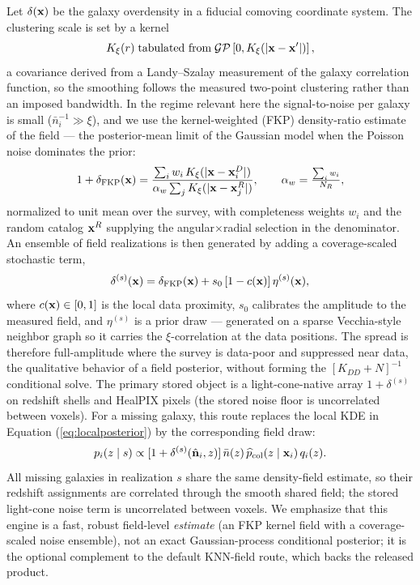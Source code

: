 \documentclass[apj]{emulateapj}
\begin{document}
Let $\delta({\bf x})$ be the galaxy overdensity in a fiducial comoving
coordinate system.  The clustering scale is set by a kernel
\begin{equation}
  K_\xi(r) \;\text{tabulated from}\;
  {\cal GP}\left[0,K_\xi(|{\bf x}-{\bf x}'|)\right],
  \label{eq:gpprior}
\end{equation}
a covariance derived from a Landy--Szalay measurement of the galaxy correlation
function, so the smoothing follows the measured two-point clustering rather than
an imposed bandwidth.  In the regime relevant here the signal-to-noise per
galaxy is small ($\bar n_i^{-1}\!\gg\!\xi$), and we use the kernel-weighted
(FKP) density-ratio estimate of the field --- the posterior-mean limit of the
Gaussian model when the Poisson noise dominates the prior:
\begin{equation}
  1+\delta_{\rm FKP}({\bf x}) =
  \frac{\sum_i w_i\,K_\xi(|{\bf x}-{\bf x}_i^{D}|)}
       {\alpha_w \sum_j K_\xi(|{\bf x}-{\bf x}_j^{R}|)},
  \qquad \alpha_w=\tfrac{\sum_i w_i}{N_R},
  \label{eq:fkpkde}
\end{equation}
normalized to unit mean over the survey, with completeness weights $w_i$ and the
random catalog ${\bf x}^R$ supplying the angular$\times$radial selection in the
denominator.  An ensemble of field realizations is then generated by adding a
coverage-scaled stochastic term,
\begin{equation}
  \delta^{(s)}({\bf x}) =
  \delta_{\rm FKP}({\bf x})
  + s_0\,[1-c({\bf x})]\,\eta^{(s)}({\bf x}),
  \label{eq:gpensemble}
\end{equation}
where $c({\bf x})\in[0,1]$ is the local data proximity, $s_0$ calibrates the
amplitude to the measured field, and $\eta^{(s)}$ is a prior draw --- generated
on a sparse Vecchia-style neighbor graph \citep{Katzfuss2020,Schafer2021} so it
carries the $\xi$-correlation at the data positions.  The spread is therefore
full-amplitude where the survey is data-poor and suppressed near data, the
qualitative behavior of a field posterior, without forming the $[K_{DD}+N]^{-1}$
conditional solve.  The primary stored object is a light-cone-native array
$1+\delta^{(s)}$ on redshift shells and HealPIX pixels (the stored noise floor is
uncorrelated between voxels).  For a missing galaxy, this route replaces the
local KDE in Equation (\ref{eq:localposterior}) by the corresponding field draw:
\begin{equation}
  p_i(z\mid s) \propto
  [1+\delta^{(s)}(\hat{\bf n}_i,z)]\,\bar n(z)\,
  \widehat{p}_{\rm col}(z\mid{\bf x}_i)\,q_i(z).
  \label{eq:graphgpz}
\end{equation}
All missing galaxies in realization $s$ share the same density-field estimate, so
their redshift assignments are correlated through the smooth shared field; the
stored light-cone noise term is uncorrelated between voxels.  We emphasize that
this engine is a fast, robust field-level
\emph{estimate} (an FKP kernel field with a coverage-scaled noise ensemble), not
an exact Gaussian-process conditional posterior; it is the optional complement to
the default KNN-field route, which backs the released product.
\end{document}
